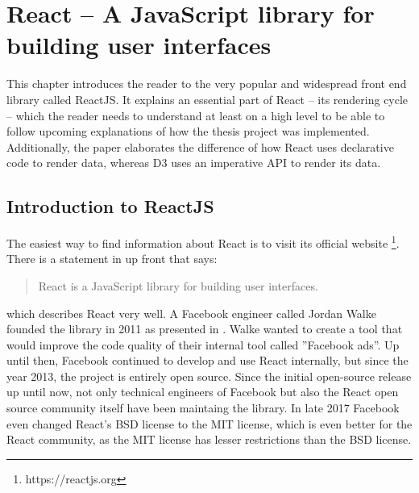 \chapter{React – A JavaScript library for building user interfaces}
\label{cha:react}

This chapter introduces the reader to the very popular and widespread front end library called ReactJS. It explains an essential part of React -- its rendering cycle -- which the reader needs to understand at least on a high level to be able to follow upcoming explanations of how the thesis project was implemented. Additionally, the paper elaborates the difference of how React uses declarative code to render data, whereas D3 uses an imperative API to render its data.

\section{Introduction to ReactJS}

The easiest way to find information about React is to visit its official website \footnote{https://reactjs.org}. There is a statement in \cite{React} up front that says: \begin{quote}\begin{english}React is a JavaScript library for building user interfaces.\end{english}\end{quote} which describes React very well. A Facebook engineer called Jordan Walke founded the library in 2011 as presented in \cite[05:30]{ReactFoundingVideo}. Walke wanted to create a tool that would improve the code quality of their internal tool called ''Facebook ads''. Up until then, Facebook continued to develop and use React internally, but since the year 2013, the project is entirely open source. Since the initial open-source release up until now, not only technical engineers of Facebook but also the React open source community itself have been maintaing the library. In late 2017 Facebook even changed React's BSD license to the MIT license, which is even better for the React community, as the MIT license has lesser restrictions than the BSD license.

